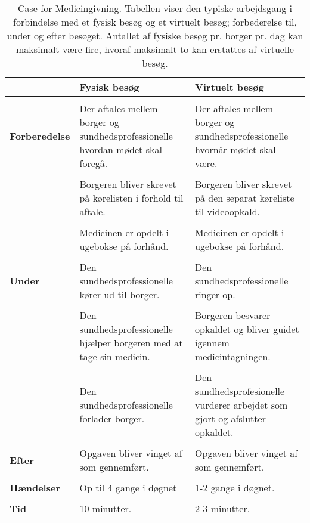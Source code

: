 \begin{table}[H]
	\caption{Case for Medicingivning. Tabellen viser den typiske arbejdsgang i forbindelse med et fysisk besøg og et virtuelt besøg; forbederelse til, under og efter besøget. Antallet af fysiske besøg pr. borger pr. dag kan maksimalt være fire, hvoraf maksimalt to kan erstattes af virtuelle besøg.}
	\centering
	\label{tab:Case}
	\begin{tabularx}{\textwidth}{|l|X|X|}
		
		\hline
		  & \textbf{Fysisk besøg} & \textbf{Virtuelt besøg}\\ \hline
		& & \\\textbf{Forberedelse} & Der aftales mellem borger og sundhedsprofessionelle hvordan mødet skal foregå. & Der aftales mellem borger og sundhedsprofessionelle hvornår mødet skal være.\\ & &\\
		 & Borgeren bliver skrevet på kørelisten i forhold til aftale. & Borgeren bliver skrevet på den separat køreliste til videoopkald.\\  & &\\
		 & Medicinen er opdelt i ugebokse på forhånd. & Medicinen er opdelt i ugebokse på forhånd.\\[4ex] \hline & & \\
		\textbf{ Under} & Den sundhedsprofessionelle kører ud til borger. & Den sundhedsprofessionelle ringer op.\\  & &\\
		  & Den sundhedsprofessionelle hjælper borgeren med at tage sin medicin. & Borgeren besvarer opkaldet og bliver guidet igennem medicintagningen.\\ & &\\
		  & Den sundhedsprofessionelle forlader borger. & Den sundhedsprofesionelle vurderer arbejdet som gjort og afslutter opkaldet.\\[4ex] \hline & & \\\textbf{Efter} & Opgaven bliver vinget af som gennemført. & Opgaven bliver vinget af som gennemført.\\[4ex] \hline
		  & & \\\textbf{Hændelser} & Op til 4 gange i døgnet & 1-2 gange i døgnet.\\ [4ex] \hline
		  & & \\\textbf{Tid} & 10 minutter. & 2-3 minutter.\\[4ex] \hline
	\end{tabularx}
\end{table}

